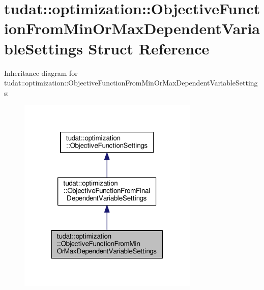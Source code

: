 \hypertarget{structtudat_1_1optimization_1_1ObjectiveFunctionFromMinOrMaxDependentVariableSettings}{}\section{tudat\+:\+:optimization\+:\+:Objective\+Function\+From\+Min\+Or\+Max\+Dependent\+Variable\+Settings Struct Reference}
\label{structtudat_1_1optimization_1_1ObjectiveFunctionFromMinOrMaxDependentVariableSettings}


Inheritance diagram for tudat\+:\+:optimization\+:\+:Objective\+Function\+From\+Min\+Or\+Max\+Dependent\+Variable\+Settings\+:
\nopagebreak
\begin{figure}[H]
\begin{center}
\leavevmode
\includegraphics[width=244pt]{structtudat_1_1optimization_1_1ObjectiveFunctionFromMinOrMaxDependentVariableSettings__inherit__graph}
\end{center}
\end{figure}


